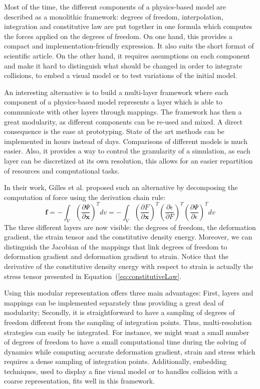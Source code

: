 Most of the time, the different components of a physics-based model are described as a monolithic framework: degrees of freedom, interpolation, integration and constitutive law are put together in one formula which computes the forces applied on the degrees of freedom. On one hand, this provides a compact and implementation-friendly expression. It also suits the short format of scientific article. On the other hand, it requires assumptions on each component and make it hard to distinguish what should be changed in order to integrate collisions, to embed a visual model or to test variations of the initial model.

An interesting alternative is to build a multi-layer framework where each component of a physics-based model represents a layer which is able to communicate with other layers through mappings. 
The framework has then a great modularity, as different components can be re-used and mixed. A direct consequence is the ease at prototyping. 
State of the art methods can be implemented in hours instead of days. 
Comparisons of different models is much easier. 
Also, it provides a way to control the granularity of a simulation, as each layer can be discretized at its own resolution, this allows for an easier repartition of resources and computational tasks.

In their work, Gilles et al. \cite{Gilles2011} proposed such an alternative by decomposing the computation of force using the derivation chain rule:
\begin{equation}
\label{eq:forceChainRule}
\displaystyle \mathbf{f} = -\int_{V} \left(\frac{\partial \Psi}{\partial \mathbf{x}}\right)^{T} dv
=
-\int_{V} \left(\frac{\partial F}{\partial \mathbf{x}}\right)^{T}
\left(\frac{\partial \epsilon}{\partial F}\right)^{T}
\left(\frac{\partial \Psi}{\partial \epsilon}\right)^{T} dv
\end{equation}
The three different layers are now visible: the degrees of freedom, the deformation gradient, the strain tensor and the constitutive density energy.
Moreover, we can distinguish the Jacobian of the mappings that link degrees of freedom to deformation gradient and deformation gradient to strain.
Notice that the derivative of the constitutive density energy with respect to strain is actually the stress tensor presented in Equation~(\ref{eq:constitutiveLaw}.

Using this modular representation offers three main advantages: 
First, layers and mappings can be implemented separately thus providing a great deal of modularity;
Secondly, it is straightforward to have a sampling of degrees of freedom different from the sampling of integration points.
Thus, multi-resolution strategies can easily be integrated. 
For instance, we might want a small number of degrees of freedom to have a small computational time during the solving of dynamics while computing accurate deformation gradient, strain and stress which requires a dense sampling of integration points.
Additionally, embedding techniques, used to display a fine visual model or to handles collision with a coarse representation, fits well in this framework.

